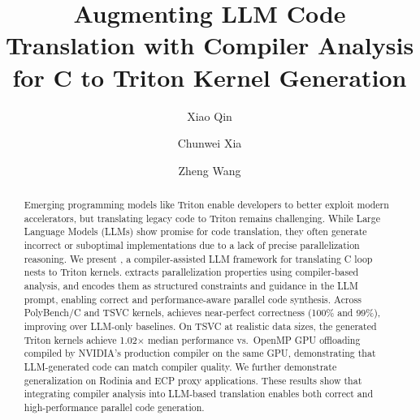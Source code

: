 \documentclass[sigconf]{acmart}
\begin{document}
\title{Augmenting LLM Code Translation with Compiler Analysis for C to Triton Kernel Generation}

\author{Xiao Qin}

\author{Chunwei Xia}

\author{Zheng Wang}




\begin{abstract}
Emerging programming models like Triton enable developers to better exploit modern accelerators, but translating legacy code to Triton remains challenging. While Large Language Models (LLMs) show promise for code translation, they often generate incorrect or suboptimal implementations due to a lack of precise parallelization reasoning.
%
We present \sysname, a compiler-assisted LLM framework for translating C loop nests to Triton kernels. \sysname extracts parallelization properties using compiler-based analysis, and encodes them as structured constraints and guidance in the LLM prompt, enabling correct and performance-aware parallel code synthesis.
%
Across PolyBench/C and TSVC kernels, \sysname achieves near-perfect correctness (100\% and 99\%), improving over LLM-only baselines. On TSVC at realistic data sizes, the generated Triton kernels achieve 1.02$\times$ median performance vs.\ OpenMP GPU offloading compiled by NVIDIA's production compiler on the same GPU, demonstrating that LLM-generated code can match compiler quality. We further demonstrate generalization on Rodinia and ECP proxy applications. These results show that integrating compiler analysis into LLM-based translation enables both correct and high-performance parallel code generation.


\end{abstract}
\end{document}
